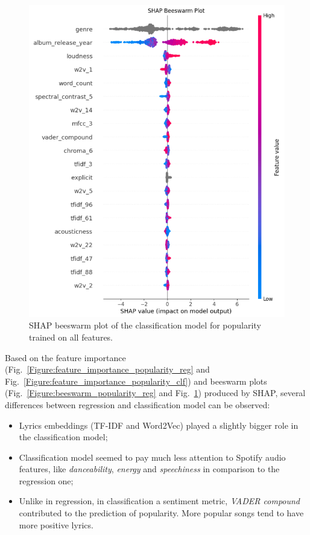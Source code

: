 \begin{center}
\begin{figure}[H]
  \centering
  \includegraphics[width=6in]{img/beeswarm_popularity_clf.png}
  \caption{SHAP beeswarm plot of the classification model for popularity trained on all features.}
  \label{Figure:beeswarm_popularity_clf}
\end{figure}
\end{center}


Based on the feature
importance (Fig.~\ref{Figure:feature_importance_popularity_reg} and
Fig.~\ref{Figure:feature_importance_popularity_clf}) and beeswarm
plots (Fig.~\ref{Figure:beeswarm_popularity_reg} and
Fig.~\ref{Figure:beeswarm_popularity_clf}) produced by SHAP, several differences
between regression and classification model can be observed:
\begin{itemize}
  \item Lyrics embeddings (TF-IDF and Word2Vec) played a slightly bigger role in
    the classification model;
  \item Classification model seemed to pay much less attention to Spotify audio
    features, like \textit{danceability}, \textit{energy} and
    \textit{speechiness} in comparison to the regression one;
  \item Unlike in regression, in classification a sentiment metric,
    \textit{VADER compound} contributed to the prediction of popularity. More
    popular songs tend to have more positive lyrics.
\end{itemize}


